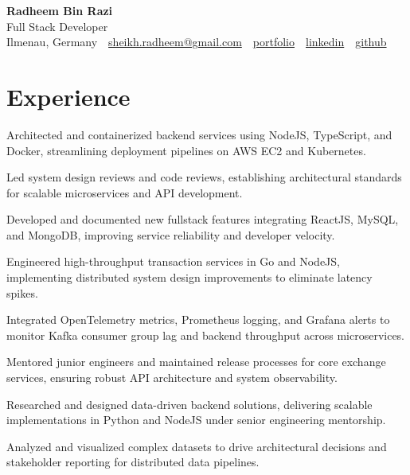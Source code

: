 \documentclass[10pt,a4paper]{resume}
\makeatletter
\newcommand{\Portfolio}{https://radheem.github.io/my-cv}
\newcommand{\PortfolioText}{portfolio}
\newcommand{\GitHub}{https://github.com/radheem}
\newcommand{\LinkedIn}{https://www.linkedin.com/in/radheem-razi}
\newcommand{\Email}{sheikh.radheem@gmail.com}
\makeatother
\begin{document}
\begin{center}
  {\huge\bfseries Radheem Bin Razi}\\[3pt]
  {\large Full Stack Developer}\\[6pt]
  \small
  Ilmenau, Germany \,\textbar\,
  \href{mailto:\Email}{\Email} \,\textbar\,
  \href{\Portfolio}{\PortfolioText} \,\textbar\,
  \href{\LinkedIn}{linkedin} \,\textbar\,
  \href{\GitHub}{github}
\end{center}
\vspace{2pt}

\section{Experience}

\bullets
  \item Architected and containerized backend services using NodeJS, TypeScript, and Docker, streamlining deployment pipelines on AWS EC2 and Kubernetes.
  \item Led system design reviews and code reviews, establishing architectural standards for scalable microservices and API development.
  \item Developed and documented new fullstack features integrating ReactJS, MySQL, and MongoDB, improving service reliability and developer velocity.
\bulletsend
\vspace{1.5pt}
\bullets
  \item Engineered high-throughput transaction services in Go and NodeJS, implementing distributed system design improvements to eliminate latency spikes.
  \item Integrated OpenTelemetry metrics, Prometheus logging, and Grafana alerts to monitor Kafka consumer group lag and backend throughput across microservices.
  \item Mentored junior engineers and maintained release processes for core exchange services, ensuring robust API architecture and system observability.
\bulletsend
\vspace{1.5pt}
\bullets
  \item Researched and designed data-driven backend solutions, delivering scalable implementations in Python and NodeJS under senior engineering mentorship.
  \item Analyzed and visualized complex datasets to drive architectural decisions and stakeholder reporting for distributed data pipelines.
\bulletsend
\vspace{1.5pt}
\end{document}
